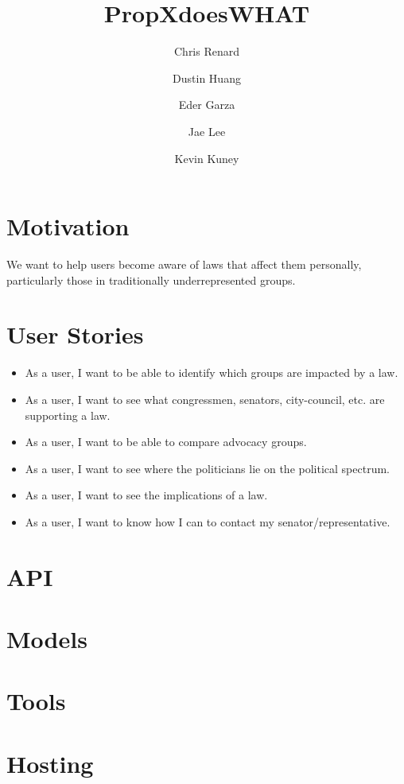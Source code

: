 \documentclass[12pt]{article}
\title{PropXdoesWHAT}
\author{Chris Renard \and Dustin Huang \and Eder Garza \and Jae Lee \and Kevin Kuney}
\date{} %
\begin{document}
\maketitle

\section{Motivation}

We want to help users become aware of laws that affect them personally, particularly those in traditionally underrepresented groups.

\section{User Stories}

\begin{itemize}
	\item As a user, I want to be able to identify which groups are impacted by a law.
	\item As a user, I want to see what congressmen, senators, city-council, etc. are supporting a law.
	\item As a user, I want to be able to compare advocacy groups.
	\item As a user, I want to see where the politicians lie on the political spectrum.
	\item As a user, I want to see the implications of a law.
	\item As a user, I want to know how I can to contact my senator/representative.
\end{itemize}

\section{API}

\section{Models}

\section{Tools}

\section{Hosting}
\end{document}
